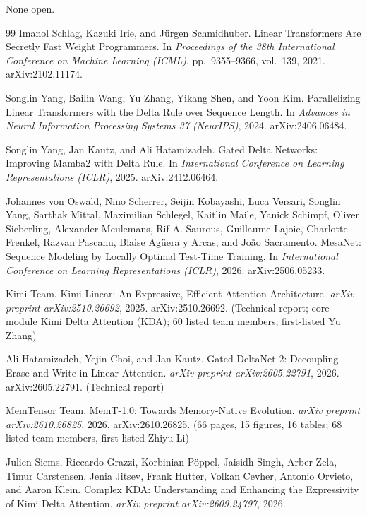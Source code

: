 \documentclass[11pt]{article}
\begin{document}
None open.

\begin{thebibliography}{99}
 Imanol Schlag, Kazuki Irie, and J{\"u}rgen Schmidhuber. Linear Transformers Are Secretly Fast Weight Programmers. In \emph{Proceedings of the 38th International Conference on Machine Learning (ICML)}, pp.~9355--9366, vol.~139, 2021. arXiv:2102.11174.

 Songlin Yang, Bailin Wang, Yu Zhang, Yikang Shen, and Yoon Kim. Parallelizing Linear Transformers with the Delta Rule over Sequence Length. In \emph{Advances in Neural Information Processing Systems 37 (NeurIPS)}, 2024. arXiv:2406.06484.

 Songlin Yang, Jan Kautz, and Ali Hatamizadeh. Gated Delta Networks: Improving Mamba2 with Delta Rule. In \emph{International Conference on Learning Representations (ICLR)}, 2025. arXiv:2412.06464.

 Johannes von Oswald, Nino Scherrer, Seijin Kobayashi, Luca Versari, Songlin Yang, Sarthak Mittal, Maximilian Schlegel, Kaitlin Maile, Yanick Schimpf, Oliver Sieberling, Alexander Meulemans, Rif A. Saurous, Guillaume Lajoie, Charlotte Frenkel, Razvan Pascanu, Blaise Ag{\"u}era y Arcas, and Jo{\~a}o Sacramento. MesaNet: Sequence Modeling by Locally Optimal Test-Time Training. In \emph{International Conference on Learning Representations (ICLR)}, 2026. arXiv:2506.05233.

 Kimi Team. Kimi Linear: An Expressive, Efficient Attention Architecture. \emph{arXiv preprint arXiv:2510.26692}, 2025. arXiv:2510.26692. (Technical report; core module Kimi Delta Attention (KDA); 60 listed team members, first-listed Yu Zhang)

 Ali Hatamizadeh, Yejin Choi, and Jan Kautz. Gated DeltaNet-2: Decoupling Erase and Write in Linear Attention. \emph{arXiv preprint arXiv:2605.22791}, 2026. arXiv:2605.22791. (Technical report)

 MemTensor Team. MemT-1.0: Towards Memory-Native Evolution. \emph{arXiv preprint arXiv:2610.26825}, 2026. arXiv:2610.26825. (66 pages, 15 figures, 16 tables; 68 listed team members, first-listed Zhiyu Li)

 Julien Siems, Riccardo Grazzi, Korbinian P{\"o}ppel, Jaisidh Singh, Arber Zela, Timur Carstensen, Jenia Jitsev, Frank Hutter, Volkan Cevher, Antonio Orvieto, and Aaron Klein. Complex {KDA}: Understanding and Enhancing the Expressivity of Kimi Delta Attention. \emph{arXiv preprint arXiv:2609.24797}, 2026.


\end{thebibliography}
\end{document}
